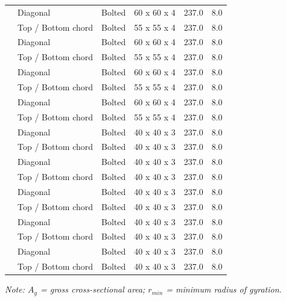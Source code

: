 \documentclass[12pt,a4paper]{report}
\numberwithin{table}{chapter}
\numberwithin{figure}{chapter}
\newcommand{\ReportTableRowGap}{6pt}
\begin{document}
\begin{longtable}{|C{2.0cm}|L{2.0cm}|L{2.2cm}|C{2.5cm}|C{2.0cm}|C{2.0cm}|}
 & Diagonal & Bolted & 60 x 60 x 4 & 237.0 & 8.0 \\[\ReportTableRowGap]
 & Top / Bottom chord & Bolted & 55 x 55 x 4 & 237.0 & 8.0 \\[\ReportTableRowGap]
\hline
{} & Diagonal & Bolted & 60 x 60 x 4 & 237.0 & 8.0 \\[\ReportTableRowGap]
 & Top / Bottom chord & Bolted & 55 x 55 x 4 & 237.0 & 8.0 \\[\ReportTableRowGap]
\hline
{} & Diagonal & Bolted & 60 x 60 x 4 & 237.0 & 8.0 \\[\ReportTableRowGap]
 & Top / Bottom chord & Bolted & 55 x 55 x 4 & 237.0 & 8.0 \\[\ReportTableRowGap]
\hline
{} & Diagonal & Bolted & 60 x 60 x 4 & 237.0 & 8.0 \\[\ReportTableRowGap]
 & Top / Bottom chord & Bolted & 55 x 55 x 4 & 237.0 & 8.0 \\[\ReportTableRowGap]
\hline
{} & Diagonal & Bolted & 40 x 40 x 3 & 237.0 & 8.0 \\[\ReportTableRowGap]
 & Top / Bottom chord & Bolted & 40 x 40 x 3 & 237.0 & 8.0 \\[\ReportTableRowGap]
\hline
{} & Diagonal & Bolted & 40 x 40 x 3 & 237.0 & 8.0 \\[\ReportTableRowGap]
 & Top / Bottom chord & Bolted & 40 x 40 x 3 & 237.0 & 8.0 \\[\ReportTableRowGap]
\hline
{} & Diagonal & Bolted & 40 x 40 x 3 & 237.0 & 8.0 \\[\ReportTableRowGap]
 & Top / Bottom chord & Bolted & 40 x 40 x 3 & 237.0 & 8.0 \\[\ReportTableRowGap]
\hline
{} & Diagonal & Bolted & 40 x 40 x 3 & 237.0 & 8.0 \\[\ReportTableRowGap]
 & Top / Bottom chord & Bolted & 40 x 40 x 3 & 237.0 & 8.0 \\[\ReportTableRowGap]
\hline
{} & Diagonal & Bolted & 40 x 40 x 3 & 237.0 & 8.0 \\[\ReportTableRowGap]
 & Top / Bottom chord & Bolted & 40 x 40 x 3 & 237.0 & 8.0 \\[\ReportTableRowGap]
\hline
\end{longtable}
\noindent\textit{Note: $A_g$ = gross cross-sectional area; $r_{min}$ = minimum radius of gyration.}
\end{document}
